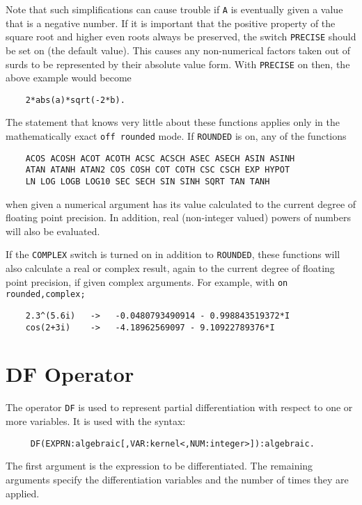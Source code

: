 Note that such simplifications can cause trouble if {\tt A} is eventually
given a value that is a negative number.  If it is important that the
positive property of the square root and higher even roots always be
preserved, the switch {\tt PRECISE} should be set on
(the default value).
This causes any non-numerical factors taken out of surds to be represented
by their absolute value form.
With %
{\tt PRECISE} on then, the above example would become
\begin{verbatim}
	2*abs(a)*sqrt(-2*b).
\end{verbatim}

The statement that {\REDUCE} knows very little about these functions
applies only in the mathematically exact {\tt off rounded} mode.  If
{\tt ROUNDED} is on, any of the functions
\begin{verbatim}
	ACOS ACOSH ACOT ACOTH ACSC ACSCH ASEC ASECH ASIN ASINH
	ATAN ATANH ATAN2 COS COSH COT COTH CSC CSCH EXP HYPOT
	LN LOG LOGB LOG10 SEC SECH SIN SINH SQRT TAN TANH
\end{verbatim}
when given a numerical argument has its value calculated to the current
degree of floating point precision.  In addition, real (non-integer
valued) powers of numbers will also be evaluated.

If the {\tt COMPLEX} switch is turned on in addition to {\tt ROUNDED},
these functions will also calculate a real or complex result, again to
the current degree of floating point precision,
if given complex arguments.  For example, with {\tt on rounded,complex;}
\begin{verbatim}
	2.3^(5.6i)   ->   -0.0480793490914 - 0.998843519372*I
	cos(2+3i)    ->   -4.18962569097 - 9.10922789376*I
\end{verbatim}

\section{DF Operator}
The operator {\tt DF} is used to represent partial
differentiation with respect
to one or more variables. It is used with the syntax:
\begin{verbatim}
     DF(EXPRN:algebraic[,VAR:kernel<,NUM:integer>]):algebraic.
\end{verbatim}
The first argument is the expression to be differentiated. The remaining
arguments specify the differentiation variables and the number of times
they are applied.

